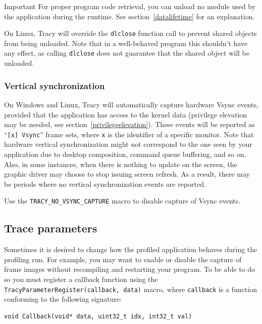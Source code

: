 \documentclass[hidelinks,titlepage,a4paper,twoside]{article}
\begin{document}
\begin{bclogo}[
noborder=true,
couleur=black!5,
logo=\bcbombe
]{Important}
For proper program code retrieval, you can unload no module used by the application during the runtime. See section~\ref{datalifetime} for an explanation.

On Linux, Tracy will override the \texttt{dlclose} function call to prevent shared objects from being unloaded. Note that in a well-behaved program this shouldn't have any effect, as calling \texttt{dlclose} does not guarantee that the shared object will be unloaded.
\end{bclogo}

\subsubsection{Vertical synchronization}
\label{vsync}

On Windows and Linux, Tracy will automatically capture hardware Vsync events, provided that the application has access to the kernel data (privilege elevation may be needed, see section~\ref{privilegeelevation}). These events will be reported as \enquote{\texttt{[x] Vsync}} frame sets, where \texttt{x} is the identifier of a specific monitor. Note that hardware vertical synchronization might not correspond to the one seen by your application due to desktop composition, command queue buffering, and so on. Also, in some instances, when there is nothing to update on the screen, the graphic driver may choose to stop issuing screen refresh. As a result, there may be periods where no vertical synchronization events are reported.

Use the \texttt{TRACY\_NO\_VSYNC\_CAPTURE} macro to disable capture of Vsync events.

\subsection{Trace parameters}
\label{traceparameters}

Sometimes it is desired to change how the profiled application behaves during the profiling run. For example, you may want to enable or disable the capture of frame images without recompiling and restarting your program. To be able to do so you must register a callback function using the \texttt{TracyParameterRegister(callback, data)} macro, where \texttt{callback} is a function conforming to the following signature:

\begin{lstlisting}
void Callback(void* data, uint32_t idx, int32_t val)
\end{lstlisting}
\end{document}
